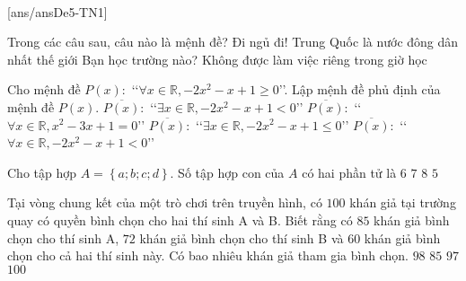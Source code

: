 ﻿﻿\begin{name}
	{\tenchude}
	{\tendethi}
	{\tentruong}
	{\thoigian}
\end{name}
\setcounter{ex}{0}\setcounter{bt}{0}
\TN
{}[ans/ansDe5-TN1]
\begin{ex}%
	Trong các câu sau, câu nào là mệnh đề?
	\choice
	{Đi ngủ đi!}
	{\True Trung Quốc là nước đông dân nhất thế giới}
	{Bạn học trường nào?}
	{Không được làm việc riêng trong giờ học}
\end{ex}

\begin{ex}%
	Cho mệnh đề $P(x)\colon$ \lq\lq$\forall x\in\mathbb{R}, -2x^2-x+1\geq 0$\rq\rq. Lập mệnh đề phủ định của mệnh đề $P(x)$.
	\choice
	{\True $\overline{P(x)}\colon$ \lq\lq$\exists x\in\mathbb{R}, -2x^2-x+1<0$\rq\rq}
	{$\overline{P(x)}\colon$ \lq\lq$\forall x\in\mathbb{R}, x^2-3x+1=0$\rq\rq}
	{$\overline{P(x)}\colon$ \lq\lq$\exists x\in\mathbb{R}, -2x^2-x+1\leq 0$\rq\rq}
	{$\overline{P(x)}\colon$ \lq\lq$\forall x\in\mathbb{R}, -2x^2-x+1<0$\rq\rq}
\end{ex}

\begin{ex}%
	Cho tập hợp $A=\left\{a;b;c;d\right\}$. Số tập hợp con của $A$ có hai phần tử là
	\choice
	{\True $6$}
	{$7$}
	{$8$}
	{$5$}
\end{ex}

\begin{ex}%
	Tại vòng chung kết của một trò chơi trên truyền hình, có $100$ khán giả tại trường quay có quyền bình chọn cho hai thí sinh A và B. Biết rằng có $85$ khán giả bình chọn cho thí sinh A, $72$ khán giả bình chọn cho thí sinh B và $60$ khán giả bình chọn cho cả hai thí sinh này. Có bao nhiêu khán giả tham gia bình chọn.
	\choice
	{$98$}
	{$85$}
	{\True $97$}
	{$100$}
\end{ex}


